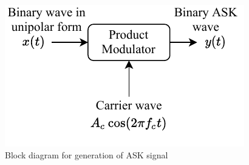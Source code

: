 \documentclass{lab_sheet}
\begin{document}
\begin{figure}[H]
    \centering
    \includegraphics{../Figures/ask_block}
    \caption{Block diagram for generation of ASK signal}
    \label{fig:ask_block}
\end{figure}
\end{document}
